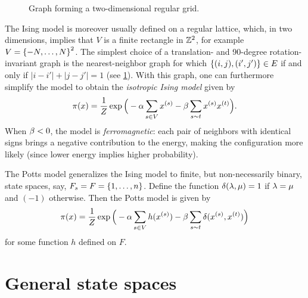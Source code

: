 \begin{figure}[h]
\begin{center}
\caption{\label{fig:grid} Graph forming a two-dimensional regular
  grid.}
\end{center}
\end{figure}
The Ising model is moreover usually defined on a regular lattice,
which, in two dimensions, implies that $V$ is a finite
rectangle in ${\mathbb{Z}}^2$, for example $V = \left\{ -N,\ldots, N \right\}^2$. The simplest
choice of a translation- and 90-degree rotation-invariant graph is the
nearest-neighbor graph for which $\left\{ (i,j), (i',j') \right\}\in E$ if and
only if $|i-i'| + |j-j'| =1$ (see \cref{fig:grid}). With this graph, one can furthermore
simplify the model to obtain the {\em isotropic Ising model} given by
$$
\pi(x) = \frac{1}{Z} \exp\Big( - \alpha \sum_{s\in V} x^{(s)} - \beta
\sum_{s\sim t} x^{(s)} x^{(t)}\Big) .
$$
When $\beta <0$, the model is {\em ferromagnetic}: each pair of
neighbors with identical signs brings a negative contribution to the
energy, making the configuration more likely (since lower energy
implies higher probability). 

The Potts model generalizes the Ising model  to finite, but non-necessarily binary, state spaces, say, $F_s
=F= \left\{ 1, \ldots, n \right\}$. Define the function $\delta(\lambda, \mu) = 1$ if
$\lambda=\mu$ and $(-1)$ otherwise. Then the Potts model is  given by
\begin{equation}
\label{eq:potts.model}
\pi(x) = \frac{1}{Z} \exp\Big( - \alpha \sum_{s\in V} h(x^{(s)}) - \beta
\sum_{s\sim t} \delta(x^{(s)}, x^{(t)})\Big) 
\end{equation}
for some function $h$ defined on $F$.

\section{General state spaces}
\label{sec:mrf.pdf}


